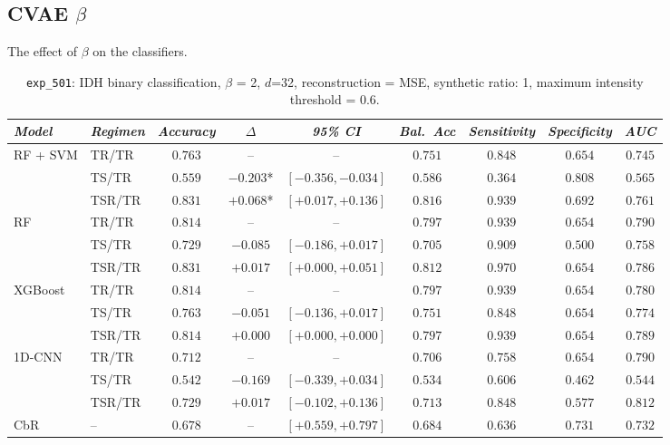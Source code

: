\subsection*{CVAE $\beta$}
The effect of $\beta$ on the classifiers.
\begin{table}[H]
\centering
\scriptsize

\label{tab:ctrl_exp_501}
\begin{tabular*}{\textwidth}{@{\extracolsep{\fill}}llccccccc}
\toprule
\emph{Model} & \emph{Regimen} & \emph{Accuracy} & \emph{$\Delta$} & \emph{95\% CI} & \emph{Bal.\ Acc} & \emph{Sensitivity} & \emph{Specificity} & \emph{AUC}\\
\midrule
\multirow{3}{*}{RF + SVM} & TR/TR & $0.763$ & -- & -- & $0.751$ & $0.848$ & $0.654$ & $0.745$\\
 & TS/TR & $0.559$ & $-0.203$* & $[-0.356, -0.034]$ & $0.586$ & $0.364$ & $0.808$ & $0.565$\\
 & TSR/TR & $0.831$ & $+0.068$* & $[+0.017, +0.136]$ & $0.816$ & $0.939$ & $0.692$ & $0.761$\\
\midrule
\multirow{3}{*}{RF} & TR/TR & $0.814$ & -- & -- & $0.797$ & $0.939$ & $0.654$ & $0.790$\\
 & TS/TR & $0.729$ & $-0.085$ & $[-0.186, +0.017]$ & $0.705$ & $0.909$ & $0.500$ & $0.758$\\
 & TSR/TR & $0.831$ & $+0.017$ & $[+0.000, +0.051]$ & $0.812$ & $0.970$ & $0.654$ & $0.786$\\
\midrule
\multirow{3}{*}{XGBoost} & TR/TR & $0.814$ & -- & -- & $0.797$ & $0.939$ & $0.654$ & $0.780$\\
 & TS/TR & $0.763$ & $-0.051$ & $[-0.136, +0.017]$ & $0.751$ & $0.848$ & $0.654$ & $0.774$\\
 & TSR/TR & $0.814$ & $+0.000$ & $[+0.000, +0.000]$ & $0.797$ & $0.939$ & $0.654$ & $0.789$\\
\midrule
\multirow{3}{*}{1D-CNN} & TR/TR & $0.712$ & -- & -- & $0.706$ & $0.758$ & $0.654$ & $0.790$\\
 & TS/TR & $0.542$ & $-0.169$ & $[-0.339, +0.034]$ & $0.534$ & $0.606$ & $0.462$ & $0.544$\\
 & TSR/TR & $0.729$ & $+0.017$ & $[-0.102, +0.136]$ & $0.713$ & $0.848$ & $0.577$ & $0.812$\\
\midrule
CbR & -- & $0.678$ & -- & $[+0.559, +0.797]$ & $0.684$ & $0.636$ & $0.731$ & $0.732$\\
\bottomrule
\end{tabular*}
\caption{\small \texttt{exp\_501}: IDH binary classification, $\beta$ = 2, $d$=32, reconstruction = MSE, synthetic ratio: 1, maximum intensity threshold = 0.6.}
\end{table}

